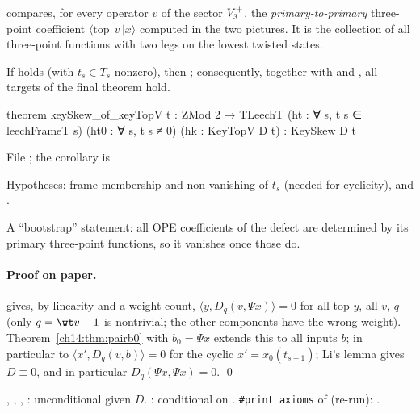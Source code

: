 \begin{physics}
 compares, for every operator $v$ of the sector $V_3^{+}$, the \emph{primary-to-primary}
three-point coefficient $\langle\text{top}|\,v\,|x\rangle$ computed in the two pictures.  It is the
collection of all three-point functions with two legs on the lowest twisted states.
\end{physics}

\begin{theorem}\label{ch14:thm:keytopv}
If  holds (with $t_s\in T_s$ nonzero), then ; consequently, together with
 and , all targets of the final theorem hold.
\end{theorem}
\begin{leancode}
theorem keySkew_of_keyTopV {t : ZMod 2 → TLeechT} (ht : ∀ s, t s ∈ leechFrameT s)
    (ht0 : ∀ s, t s ≠ 0) (hk : KeyTopV D t) : KeySkew D t
\end{leancode}
File ; the corollary is .

\begin{dictionary}
Hypotheses: frame membership and non-vanishing of $t_s$ (needed for cyclicity), and .
\end{dictionary}

\begin{physics}
A ``bootstrap'' statement: all OPE coefficients of the defect are determined by its primary
three-point functions, so it vanishes once those do.
\end{physics}

\paragraph{Proof on paper.}   gives, by linearity and a weight count,
$\langle y,D_q(v,\Psi x)\rangle=0$ for all top $y$, all $v$, $q$ (only $q=\wt v-1$ is nontrivial; the other
components have the wrong weight).  Theorem~\ref{ch14:thm:pairb0} with $b_0=\Psi x$ extends this to all
inputs $b$; in particular to $\langle x',D_q(v,b)\rangle=0$ for the cyclic $x'=x_0(t_{s+1})$; Li's lemma
gives $D\equiv0$, and in particular $D_q(\Psi x,\Psi x)=0$. \qed

\begin{status}
, , , : unconditional given $D$.
: conditional on .  \texttt{\#print axioms} of 
(re-run): .
\end{status}

